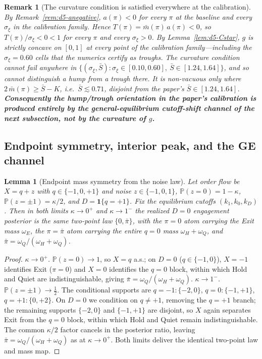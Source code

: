 \documentclass[11pt]{article}
\newtheorem{lemma}{Lemma}
\newcommand{\PP}{\mathbb{P}}
\newcommand{\1}{\mathbf{1}}
\newtheorem{remark}{Remark}
\begin{document}
\begin{remark}[The curvature condition is satisfied everywhere at the calibration]\label{rem:d5-vacuous}
By Remark~\ref{rem:d5-anegative}, $a(\pi)<0$ for every $\pi$ at the baseline and every $\sigma_\xi$ in the calibration family. Hence $T(\pi)=\bar m(\pi)\,a(\pi)<0$, so $T(\pi)/\sigma_\xi<0<1$ for every $\pi$ and every $\sigma_\xi>0$. By Lemma~\ref{lem:d5-Cstar}, $g$ is strictly concave on $[0,1]$ at every point of the calibration family---including the $\sigma_\xi=0.60$ cells that the numerics certify as \emph{troughs}. The curvature condition \emph{cannot fail} anywhere in $\{(\sigma_\xi,\bar S):\sigma_\xi\in[0.10,0.60],\ \bar S\in[1.24,1.64]\}$, and so cannot distinguish a hump from a trough there. It is non-vacuous only where $2\,\bar m(\pi)\ge\bar S-K$, i.e.\ $\bar S\lesssim0.71$, disjoint from the paper's $\bar S\in[1.24,1.64]$. \textbf{Consequently the hump/trough orientation in the paper's calibration is produced entirely by the general-equilibrium cutoff-shift channel of the next subsection, not by the curvature of $g$.}
\end{remark}

\subsection{Endpoint symmetry, interior peak, and the GE channel}
\label{app:d5-peak}

\begin{lemma}[Endpoint mass symmetry from the noise law]\label{lem:d5-endpoints}
Let order flow be $X=q+z$ with $q\in\{-1,0,+1\}$ and noise $z\in\{-1,0,1\}$, $\PP(z{=}0)=1-\kappa$, $\PP(z{=}{\pm}1)=\kappa/2$, and $D=\1\{q=+1\}$. Fix the equilibrium cutoffs $(k_1,k_0,k_D)$. Then in both limits $\kappa\to0^+$ and $\kappa\to1^-$ the realized $D=0$ engagement posterior is the \emph{same} two-point law $\{0,\bar\pi\}$, with the $\pi=0$ atom carrying the Exit mass $\omega_E$, the $\pi=\bar\pi$ atom carrying the entire $q{=}0$ mass $\omega_H+\omega_Q$, and $\bar\pi=\omega_Q/(\omega_H+\omega_Q)$.
\end{lemma}
\begin{proof}
\emph{$\kappa\to0^+$.} $\PP(z{=}0)\to1$, so $X=q$ a.s.; on $D=0$ ($q\in\{-1,0\}$), $X=-1$ identifies Exit ($\pi=0$) and $X=0$ identifies the $q{=}0$ block, within which Hold and Quiet are indistinguishable, giving $\bar\pi=\omega_Q/(\omega_H+\omega_Q)$.
\emph{$\kappa\to1^-$.} $\PP(z{=}{\pm}1)\to\tfrac12$. The conditional supports are $q=-1:\{-2,0\}$, $q=0:\{-1,+1\}$, $q=+1:\{0,+2\}$. On $D=0$ we condition on $q\neq+1$, removing the $q=+1$ branch; the remaining supports $\{-2,0\}$ and $\{-1,+1\}$ are disjoint, so $X$ again separates Exit from the $q{=}0$ block, within which Hold and Quiet remain indistinguishable. The common $\kappa/2$ factor cancels in the posterior ratio, leaving $\bar\pi=\omega_Q/(\omega_H+\omega_Q)$ as at $\kappa\to0^+$. Both limits deliver the identical two-point law and mass map.
\end{proof}
\end{document}
